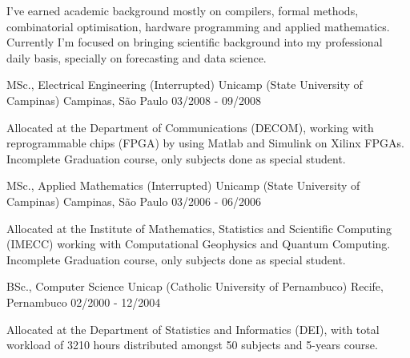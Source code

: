 
\begin{cvparagraph}
I've earned academic background mostly on compilers, formal methods, combinatorial optimisation, hardware programming and applied mathematics. Currently I'm focused on bringing scientific background into my professional daily basis, specially on forecasting and data science.
\end{cvparagraph}


\begin{cventries}

\cventry
    {MSc., Electrical Engineering (Interrupted)} %
    {Unicamp (State University of Campinas)} %
    {Campinas, São Paulo} %
    {03/2008 - 09/2008} %
    {
      \begin{cvitems} %
        \item Allocated at the Department of Communications (DECOM), working with reprogrammable chips (FPGA) by using Matlab and Simulink on Xilinx FPGAs. Incomplete Graduation course, only subjects done as special student.
      \end{cvitems}
    }

\cventry
        {MSc., Applied Mathematics (Interrupted)}
        {Unicamp (State University of Campinas)}
        {Campinas, São Paulo}
        {03/2006 - 06/2006}
        {
         \begin{cvitems}
           \item {Allocated at the Institute of Mathematics, Statistics and Scientific Computing (IMECC) working with Computational Geophysics and Quantum Computing. Incomplete Graduation course, only subjects done as special student.}
          \end{cvitems}
        }

\cventry
        {BSc., Computer Science}
        {Unicap (Catholic University of Pernambuco)}
        {Recife, Pernambuco}
        {02/2000 - 12/2004}
        {
        \begin{cvitems}
                \item Allocated at the Department of Statistics and Informatics (DEI), with total workload of 3210 hours distributed amongst 50 subjects and 5-years course.
        \end{cvitems}
        }

\end{cventries}

